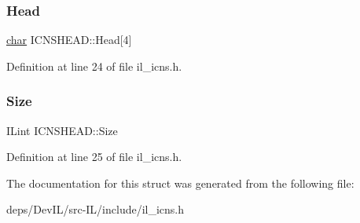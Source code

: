 \subsubsection{\texorpdfstring{Head}{Head}}
{\footnotesize\ttfamily \hyperlink{classchar}{char} I\+C\+N\+S\+H\+E\+A\+D\+::\+Head\mbox{[}4\mbox{]}}



Definition at line 24 of file il\+\_\+icns.\+h.

\mbox{\label{structICNSHEAD_aa8cb9a267f563452dd20a84db058d3d2}} 
\subsubsection{\texorpdfstring{Size}{Size}}
{\footnotesize\ttfamily I\+Lint I\+C\+N\+S\+H\+E\+A\+D\+::\+Size}



Definition at line 25 of file il\+\_\+icns.\+h.



The documentation for this struct was generated from the following file\+:\begin{DoxyCompactItemize}
\item 
deps/\+Dev\+I\+L/src-\/\+I\+L/include/il\+\_\+icns.\+h\end{DoxyCompactItemize}
